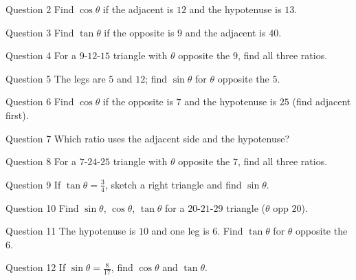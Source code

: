 \documentclass[11pt]{article}
\begin{document}
\begin{qbox}{Question 2}
Find $\cos\theta$ if the adjacent is $12$ and the hypotenuse is $13$.\workspace{1.8cm}
\end{qbox}

\begin{qbox}{Question 3}
Find $\tan\theta$ if the opposite is $9$ and the adjacent is $40$.\workspace{1.8cm}
\end{qbox}

\begin{qbox}{Question 4}
For a $9$-$12$-$15$ triangle with $\theta$ opposite the $9$, find all three ratios.\workspace{2.4cm}
\end{qbox}

\begin{qbox}{Question 5}
The legs are $5$ and $12$; find $\sin\theta$ for $\theta$ opposite the $5$.\workspace{2.2cm}
\end{qbox}

\begin{qbox}{Question 6}
Find $\cos\theta$ if the opposite is $7$ and the hypotenuse is $25$ (find adjacent first).\workspace{2.4cm}
\end{qbox}

\begin{qbox}{Question 7}
Which ratio uses the adjacent side and the hypotenuse?\workspace{1.8cm}
\end{qbox}

\begin{qbox}{Question 8}
For a $7$-$24$-$25$ triangle with $\theta$ opposite the $7$, find all three ratios.\workspace{2.4cm}
\end{qbox}

\begin{qbox}{Question 9}
If $\tan\theta=\tfrac34$, sketch a right triangle and find $\sin\theta$.\workspace{2.6cm}
\end{qbox}

\begin{qbox}{Question 10}
Find $\sin\theta$, $\cos\theta$, $\tan\theta$ for a $20$-$21$-$29$ triangle ($\theta$ opp $20$).\workspace{2.4cm}
\end{qbox}

\begin{qbox}{Question 11}
The hypotenuse is $10$ and one leg is $6$. Find $\tan\theta$ for $\theta$ opposite the $6$.\workspace{2.4cm}
\end{qbox}

\begin{qbox}{Question 12}
If $\sin\theta=\tfrac{8}{17}$, find $\cos\theta$ and $\tan\theta$.\workspace{2.4cm}
\end{qbox}
\end{document}

